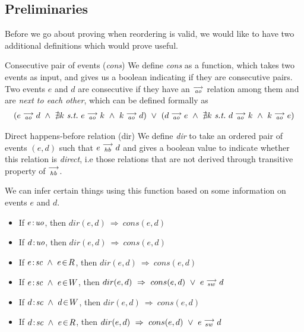 \subsection{Preliminaries}
Before we go about proving when reordering is valid, we would like to have two additional definitions which would prove useful.

\begin{definition}{Consecutive pair of events (\emph{cons})}
    \label{Cons}
    We define \emph{cons} as a function, which takes two events as input, and gives us a boolean indicating if they are consecutive pairs. Two events $e$ and $d$ are consecutive if they have an $\stackrel{\longrightarrow}{_\textit{ao}}$ relation among them and are \emph{next to each other}, which can be defined formally as 
        \begin{align*}
            (
            e \stck{_\textit{ao}} d  \ \wedge \ 
            \nexists k \ \textit{s.t.} \ 
            e \stck{_\textit{ao}} k  \ \wedge \
            k \stck{_\textit{ao}} d 
            )
            \ \vee \
            (
                d \stck{_\textit{ao}} e  \ \wedge \ 
                \nexists k \ \textit{s.t.} \ 
                d \stck{_\textit{ao}} k  \ \wedge \
                k \stck{_\textit{ao}} e  
            )
        \end{align*}
\end{definition}

\begin{definition}{Direct happens-before relation (dir)}
    \label{Dir}
    We define \emph{dir} to take an ordered pair of events $(e,d)$ such that $e\stackrel{\longrightarrow}{_{hb}}d$ and gives a boolean value to indicate whether this relation is \textit{direct}, i.e those relations that are not derived through transitive property of $\stackrel{\longrightarrow}{_\textit{hb}}$.
    
    We can infer certain things using this function based on some information on events $e$ and $d$. 
    \begin{itemize}
        \item If $e\!:\!\textit{uo}$, then $dir(e,d) \ \Rightarrow \ cons(e,d)$
        \item If $d\!:\!\textit{uo}$, then $dir(e,d) \ \Rightarrow \ cons(e,d)$
        \item If $\et{e}{sc}\ \wedge\ e\!\in\!R$, then $dir(e,d) \ \Rightarrow \ cons(e,d)$
        \item If $\et{e}{sc}\ \wedge\ e\!\in\!W$, then $dir(e,d) \ \Rightarrow \ cons(e,d)\ \vee\ \reln{e}{sw}{d}$
        \item If $\et{d}{sc}\ \wedge\ d\!\in\!W$, then $dir(e,d) \ \Rightarrow \ cons(e,d)$
        \item If $\et{d}{sc}\ \wedge\ e\!\in\!R$, then $dir(e,d) \ \Rightarrow \ cons(e,d)\ \vee\ \reln{e}{sw}{d}$
    \end{itemize}
\end{definition}



